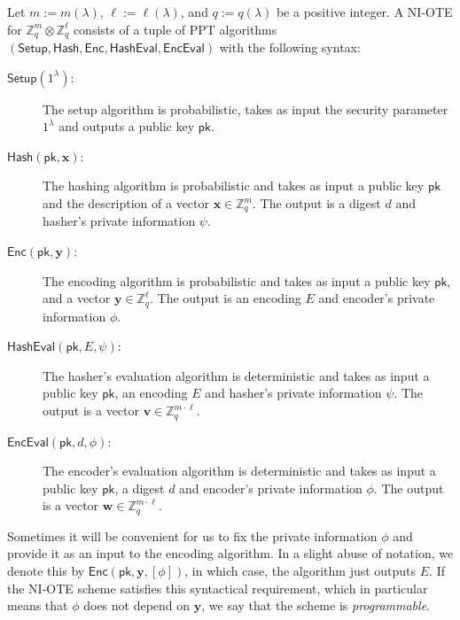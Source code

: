 \documentclass{theoretics}
\newcommand{\Z}{\mathbb{Z}}
\renewcommand{\sec}{\ensuremath{\lambda}}
\newcommand{\algofont}[1]{\ensuremath{\mathsf{#1}}}
\newcommand{\Enc}{{\algofont{Enc}}}
\newcommand{\Setup}{{\algofont{Setup}}}
\newcommand{\Eval}{\algofont{Eval}\xspace}
\newcommand{\Hash}{{\algofont{Hash}}}
\newcommand{\pk}{{\mathsf{pk}}}
\newcommand\bbbone{1}
\begin{document}
\begin{definition}
Let $m:=m(\sec)$, $\ell:=\ell(\sec)$, and  $q:=q(\sec)$ be a positive integer. A NI-OTE for $\Z_q^m\otimes\Z_q^\ell$ consists of a tuple of PPT algorithms $(\Setup, \Hash, \Enc, \Hash\Eval, \Enc\Eval)$ with the following syntax:
\begin{description}
    \item[$\Setup(\bbbone^\sec)$:] The setup algorithm is probabilistic, takes as input the security parameter $\bbbone^\sec$ and outputs a public key $\pk$.
    
    \item[$\Hash(\pk, \mathbf{x})$:] The hashing algorithm is probabilistic and takes as input a public key $\pk$ and the description of a vector $\mathbf{x}\in\Z_q^{m}$. The output is a digest $d$ and hasher's private information $\psi$.
    \item[$\Enc(\pk, \mathbf{y})$:] The encoding algorithm is probabilistic and takes as input a public key $\pk$, and a vector $\mathbf{y}\in\Z_q^{\ell}$. The output is an encoding $E$ and encoder's private information $\phi$. 
    \item[$\Hash\Eval(\pk, E, \psi)$:] The hasher's evaluation algorithm is deterministic and takes as input a public key $\pk$, an encoding $E$ and hasher's private information $\psi$. The output is a vector $\mathbf{v}\in\Z_q^{m\cdot \ell}$.
    \item[$\Enc\Eval(\pk, d, \phi)$:] The encoder's evaluation algorithm is deterministic and takes as input a public key $\pk$, a digest $d$ and encoder's private information $\phi$. The output is a vector $\mathbf{w}\in\Z_q^{m\cdot \ell}$.
\end{description}
\end{definition}
%
Sometimes it will be convenient for us to fix the private information $\phi$ and provide it as an input to the encoding algorithm. In a slight abuse of notation, we denote this by 
$\Enc(\pk, \mathbf{y}, {[\phi]})$, in which case, the algorithm just outputs $E$. If the NI-OTE scheme satisfies this syntactical requirement, which in particular means that $\phi$ does not depend on $\mathbf{y}$, we say that the scheme is \emph{programmable}.
\end{document}
